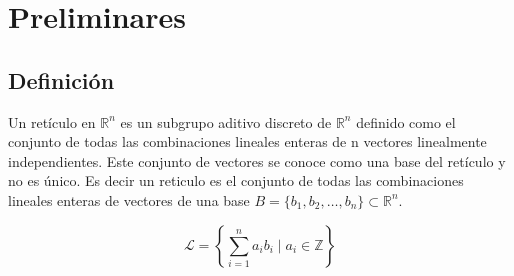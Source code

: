
\chapter{Preliminares}

\section{Definición}

Un retículo en $\mathbb{R}^n$ es un subgrupo aditivo discreto de $\mathbb{R}^n$ definido como el conjunto de todas las combinaciones lineales enteras de n vectores linealmente independientes. Este conjunto de vectores se conoce como una base del retículo y no es único. Es decir un reticulo es el conjunto de todas las combinaciones lineales enteras de vectores de una base $B=\{b_1,b_2,\ldots,b_n\} \subset \mathbb{R}^n$.

\begin{equation}
    \mathcal{L} = \left\{ \sum_{i=1}^{n} a_i b_i \mid a_i \in \mathbb{Z} \right\}
\end{equation}


\endinput
